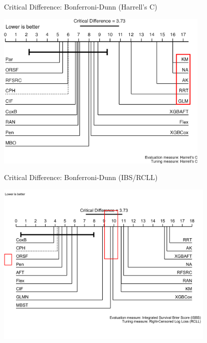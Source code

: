 \documentclass[aspectratio=169,12pt]{beamer}
\begin{document}
\begin{frame}{Critical Difference: Bonferroni-Dunn (Harrell's C)}
\label{critical-difference-bonferroni-dunn-harrells-c}
\begin{center}
\includegraphics[width=4.02in,height=0.75\textheight]{img/critical-difference-baseline-diff-harrell-c-1-annotated.png}
\end{center}
\end{frame}

\begin{frame}{Critical Difference: Bonferroni-Dunn (IBS/RCLL)}
\label{critical-difference-bonferroni-dunn-ibsrcll}
\begin{center}
\includegraphics[width=4.14in,height=0.75\textheight]{img/critical-difference-baseline-diff-rcll-7-annotated.png}
\end{center}
\end{frame}
\end{document}
